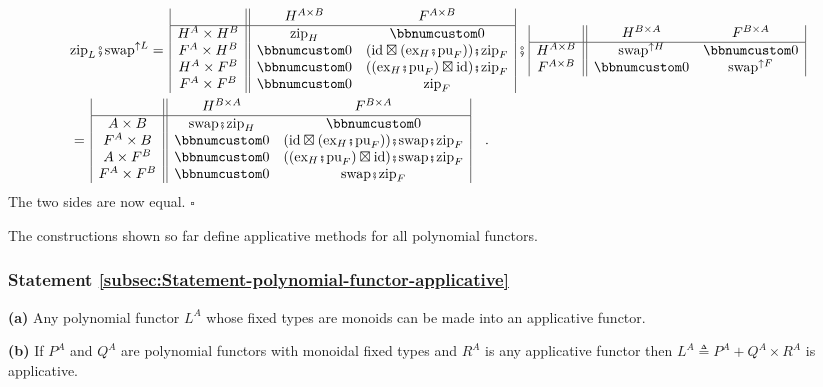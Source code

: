 \begin{align*}
 & \text{zip}_{L}\bef\text{swap}^{\uparrow L}=\,\begin{array}{|c||cc|}
 & H^{A\times B} & F^{A\times B}\\
\hline H^{A}\times H^{B} & \text{zip}_{H} & \bbnum 0\\
F^{A}\times H^{B} & \bbnum 0 & (\text{id}\boxtimes(\text{ex}_{H}\bef\text{pu}_{F}))\bef\text{zip}_{F}\\
H^{A}\times F^{B} & \bbnum 0 & ((\text{ex}_{H}\bef\text{pu}_{F})\boxtimes\text{id})\bef\text{zip}_{F}\\
F^{A}\times F^{B} & \bbnum 0 & \text{zip}_{F}
\end{array}\,\bef\,\begin{array}{|c||cc|}
 & H^{B\times A} & F^{B\times A}\\
\hline H^{A\times B} & \text{swap}^{\uparrow H} & \bbnum 0\\
F^{A\times B} & \bbnum 0 & \text{swap}^{\uparrow F}
\end{array}\\
 & =\,\begin{array}{|c||cc|}
 & H^{B\times A} & F^{B\times A}\\
\hline A\times B & \text{swap}\bef\text{zip}_{H} & \bbnum 0\\
F^{A}\times B & \bbnum 0 & (\text{id}\boxtimes(\text{ex}_{H}\bef\text{pu}_{F}))\bef\text{swap}\bef\text{zip}_{F}\\
A\times F^{B} & \bbnum 0 & ((\text{ex}_{H}\bef\text{pu}_{F})\boxtimes\text{id})\bef\text{swap}\bef\text{zip}_{F}\\
F^{A}\times F^{B} & \bbnum 0 & \text{swap}\bef\text{zip}_{F}
\end{array}\quad.
\end{align*}
The two sides are now equal. $\square$

The constructions shown so far define applicative methods for all
polynomial functors.

\subsubsection{Statement \label{subsec:Statement-polynomial-functor-applicative}\ref{subsec:Statement-polynomial-functor-applicative}}

\textbf{(a)} Any polynomial functor $L^{A}$ whose fixed types are
monoids can be made into an applicative functor. 

\textbf{(b)} If $P^{A}$ and $Q^{A}$ are polynomial functors with
monoidal fixed types and $R^{A}$ is any applicative functor then
$L^{A}\triangleq P^{A}+Q^{A}\times R^{A}$ is applicative.

